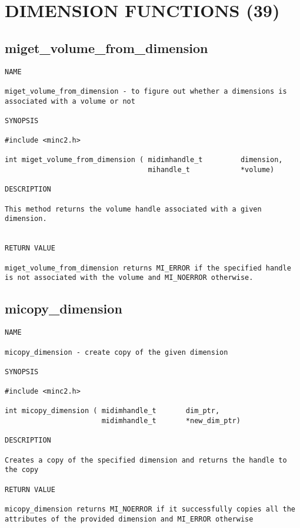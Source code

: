 \documentclass{article}
\begin{document}
\section{DIMENSION FUNCTIONS (39)}
\subsection{miget\_volume\_from\_dimension}
\begin{verbatim}
NAME 

miget_volume_from_dimension - to figure out whether a dimensions is
associated with a volume or not

SYNOPSIS

#include <minc2.h>

int miget_volume_from_dimension ( midimhandle_t         dimension,
                                  mihandle_t            *volume)
                                
DESCRIPTION

This method returns the volume handle associated with a given dimension.


RETURN VALUE

miget_volume_from_dimension returns MI_ERROR if the specified handle
is not associated with the volume and MI_NOERROR otherwise.
\end{verbatim}

\subsection{micopy\_dimension}
\begin{verbatim}
NAME

micopy_dimension - create copy of the given dimension

SYNOPSIS

#include <minc2.h>

int micopy_dimension ( midimhandle_t       dim_ptr,
                       midimhandle_t       *new_dim_ptr)

DESCRIPTION

Creates a copy of the specified dimension and returns the handle to the copy

RETURN VALUE

micopy_dimension returns MI_NOERROR if it successfully copies all the 
attributes of the provided dimension and MI_ERROR otherwise
\end{verbatim}
\end{document}
